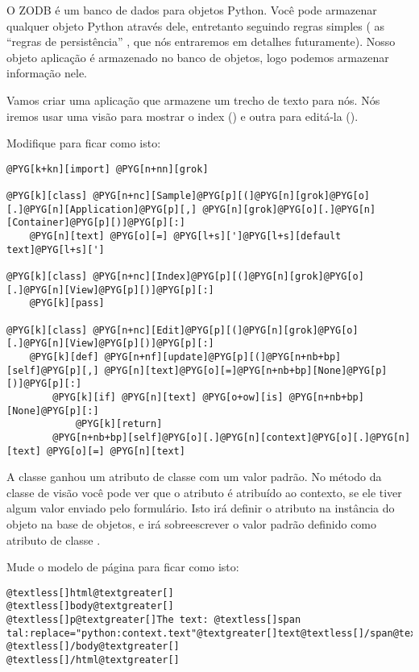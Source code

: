 \documentclass[a4paper,12pt,portuguese]{manual}
\begin{document}
O ZODB é um banco de dados para objetos Python. Você pode armazenar
qualquer objeto Python através dele, entretanto seguindo regras
simples  ( as ``regras de persistência'' , que nós entraremos em
detalhes futuramente). Nosso objeto aplicação  é armazenado
no banco de objetos, logo podemos armazenar informação nele.

Vamos criar uma aplicação que armazene um trecho de texto para nós.
Nós iremos usar uma visão para mostrar o index () e
outra para editá-la ().

Modifique  para ficar como isto:

\begin{Verbatim}[commandchars=@\[\]]
@PYG[k+kn][import] @PYG[n+nn][grok]

@PYG[k][class] @PYG[n+nc][Sample]@PYG[p][(]@PYG[n][grok]@PYG[o][.]@PYG[n][Application]@PYG[p][,] @PYG[n][grok]@PYG[o][.]@PYG[n][Container]@PYG[p][)]@PYG[p][:]
    @PYG[n][text] @PYG[o][=] @PYG[l+s][']@PYG[l+s][default text]@PYG[l+s][']

@PYG[k][class] @PYG[n+nc][Index]@PYG[p][(]@PYG[n][grok]@PYG[o][.]@PYG[n][View]@PYG[p][)]@PYG[p][:]
    @PYG[k][pass]

@PYG[k][class] @PYG[n+nc][Edit]@PYG[p][(]@PYG[n][grok]@PYG[o][.]@PYG[n][View]@PYG[p][)]@PYG[p][:]
    @PYG[k][def] @PYG[n+nf][update]@PYG[p][(]@PYG[n+nb+bp][self]@PYG[p][,] @PYG[n][text]@PYG[o][=]@PYG[n+nb+bp][None]@PYG[p][)]@PYG[p][:]
        @PYG[k][if] @PYG[n][text] @PYG[o+ow][is] @PYG[n+nb+bp][None]@PYG[p][:]
            @PYG[k][return]
        @PYG[n+nb+bp][self]@PYG[o][.]@PYG[n][context]@PYG[o][.]@PYG[n][text] @PYG[o][=] @PYG[n][text]
\end{Verbatim}

A classe  ganhou um atributo de classe com um valor padrão.
No método  da classe de visão  você pode ver
que o atributo  é atribuído ao contexto, se ele tiver algum
valor enviado pelo formulário. Isto irá definir o atributo  na
instância do objeto  na base de objetos, e irá sobreescrever
o valor padrão definido como atributo de classe .

Mude o modelo de página  para ficar como isto:

\begin{Verbatim}[commandchars=@\[\]]
@textless[]html@textgreater[]
@textless[]body@textgreater[]
@textless[]p@textgreater[]The text: @textless[]span tal:replace="python:context.text"@textgreater[]text@textless[]/span@textgreater[]@textless[]/p@textgreater[]
@textless[]/body@textgreater[]
@textless[]/html@textgreater[]
\end{Verbatim}
\end{document}
